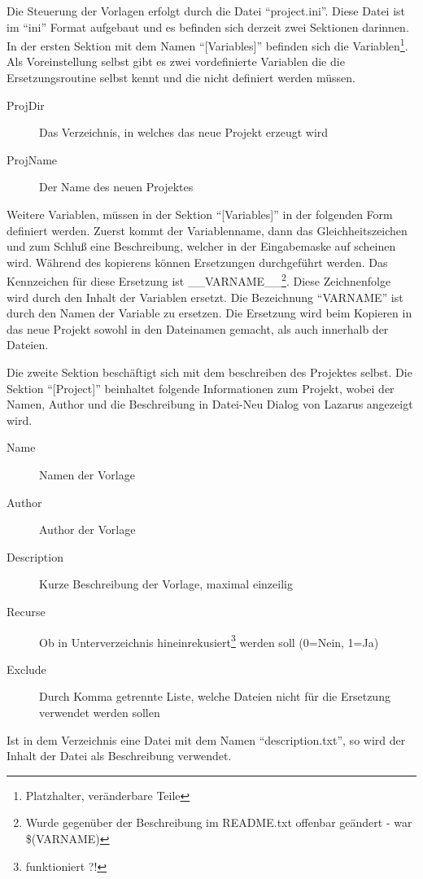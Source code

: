 Die Steuerung der Vorlagen erfolgt durch die Datei "`project.ini"'. Diese Datei ist im "`ini"' Format aufgebaut und es befinden sich derzeit zwei Sektionen darinnen. In der ersten Sektion mit dem Namen "`[Variables]"' befinden sich die Variablen\footnote{Platzhalter, veränderbare Teile}. Als Voreinstellung selbst gibt es zwei vordefinierte Variablen die die Ersetzungsroutine selbst kennt und die nicht definiert werden müssen.
\begin{description}
	\item[ProjDir]Das Verzeichnis, in welches das neue Projekt erzeugt wird
	\item[ProjName]Der Name des neuen Projektes
\end{description}
\label{fig:ProjectTempl04}Weitere Variablen, müssen in der Sektion "`[Variables]"' in der folgenden Form definiert werden. Zuerst kommt der Variablenname, dann das Gleichheitszeichen und zum Schluß eine Beschreibung, welcher in der Eingabemaske auf scheinen wird.
Während des kopierens können Ersetzungen durchgeführt werden. Das Kennzeichen für diese Ersetzung ist \_\_VARNAME\_\_\footnote{Wurde gegenüber der Beschreibung im README.txt offenbar geändert - war \$(VARNAME)}. Diese Zeichnenfolge wird durch den Inhalt der Variablen ersetzt. Die Bezeichnung "`VARNAME"' ist durch den Namen der Variable zu ersetzen. Die Ersetzung wird beim Kopieren in das neue Projekt sowohl in den Dateinamen gemacht, als auch innerhalb der Dateien. 

Die zweite Sektion beschäftigt sich mit dem beschreiben des Projektes selbst. Die Sektion "`[Project]"' beinhaltet folgende Informationen zum Projekt, wobei der Namen, Author und die Beschreibung in Datei-Neu Dialog von Lazarus angezeigt wird.
\begin{description}
	\item[Name]Namen der Vorlage
	\item[Author]Author der Vorlage
	\item[Description]Kurze Beschreibung der Vorlage, maximal einzeilig
	\item[Recurse] Ob in Unterverzeichnis hineinrekusiert\footnote{funktioniert ?!} werden soll (0=Nein, 1=Ja)
	\item[Exclude]Durch Komma getrennte Liste, welche Dateien nicht für die Ersetzung verwendet werden sollen
\end{description}	
Ist in dem Verzeichnis eine Datei mit dem Namen "`description.txt"', so wird der Inhalt der Datei als Beschreibung verwendet.

